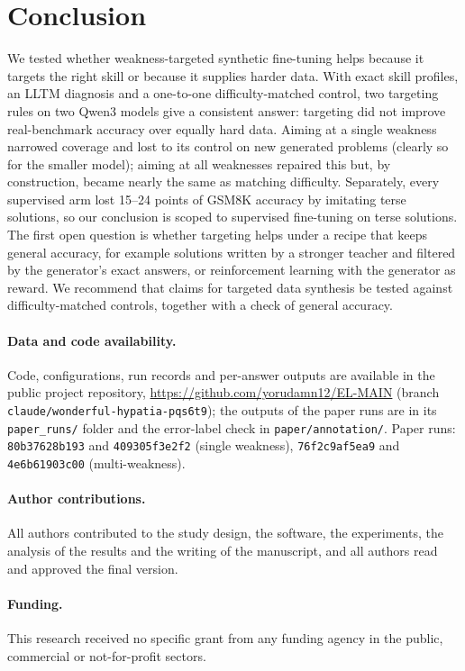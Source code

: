 \documentclass[11pt]{article}
\begin{document}
\section{Conclusion}
We tested whether weakness-targeted synthetic fine-tuning helps because it targets the right skill or because it
supplies harder data. With exact skill profiles, an LLTM diagnosis and a one-to-one difficulty-matched control, two
targeting rules on two Qwen3 models give a consistent answer: targeting did not improve real-benchmark accuracy over
equally hard data. Aiming at a single weakness narrowed coverage and lost to its control on new generated problems (clearly so for the
smaller model);
aiming at all weaknesses repaired this but, by construction, became nearly the same as matching difficulty. Separately,
every supervised arm lost 15--24 points of GSM8K accuracy by imitating terse solutions, so our conclusion is scoped to
supervised fine-tuning on terse solutions. The first open question is whether targeting helps under a recipe that
keeps general accuracy, for example solutions written by a stronger teacher and filtered by the generator's exact
answers, or reinforcement learning with the generator as reward. We recommend that claims for targeted data synthesis
be tested against difficulty-matched controls, together with a check of general accuracy.

\paragraph{Data and code availability.} Code, configurations, run records and per-answer outputs are available in the
public project repository, \url{https://github.com/yorudamn12/EL-MAIN} (branch
\texttt{claude/wonderful-hypatia-pqs6t9}); the outputs of the paper runs are in its \texttt{paper\_runs/} folder and
the error-label check in \texttt{paper/annotation/}. Paper runs: \texttt{80b37628b193} and \texttt{409305f3e2f2} (single weakness),
\texttt{76f2c9af5ea9} and \texttt{4e6b61903c00} (multi-weakness).

\paragraph{Author contributions.} All authors contributed to the study design, the software, the experiments, the
analysis of the results and the writing of the manuscript, and all authors read and approved the final version.

\paragraph{Funding.} This research received no specific grant from any funding agency in the public, commercial or
not-for-profit sectors.
\end{document}
